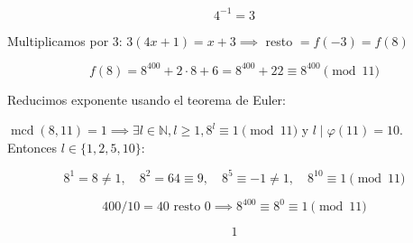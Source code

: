 \documentclass[a4paper,12pt]{article}
\begin{document}
\begin{ejercicio}[title=Ejercicio 45]

\[
4^{-1} = 3
\]

Multiplicamos por 3: $3(4x+1) = x + 3 \implies$ resto $= f(-3) = f(8)$

\[
f(8) = 8^{400} + 2 \cdot 8 + 6 = 8^{400} + 22 \equiv 8^{400} \pmod{11}
\]

Reducimos exponente usando el teorema de Euler:

\vspace{0.5em}

\(\operatorname{mcd}(8,11) = 1 \implies \exists l \in \mathbb{N}, l \ge 1, 8^l \equiv 1 \pmod{11}\) y \(l \mid \varphi(11) = 10\). \\

Entonces \(l \in \{1,2,5,10\}\):

\[
8^1 = 8 \neq 1, \quad 8^2 = 64 \equiv 9, \quad 8^5 \equiv -1 \neq 1, \quad 8^{10} \equiv 1 \pmod{11}
\]

\[
400 / 10 = 40 \text{ resto } 0 \implies 8^{400} \equiv 8^0 \equiv 1 \pmod{11}
\]

\[
\boxed{1}
\]

\end{ejercicio}
\end{document}
